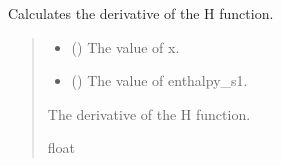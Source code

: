 \documentclass[a4paper,11pt,english,openany]{sphinxmanual}
\begin{document}
\begin{fulllineitems}
\label{\detokenize{api/spyice.update_physical_values:spyice.update_physical_values.H_function_derivate}}
\pysigstartsignatures
{}
\pysigstopsignatures
\sphinxAtStartPar
Calculates the derivative of the H function.
\begin{quote}\begin{description}
\begin{itemize}
\item {} 
\sphinxAtStartPar
{} () \textendash{} The value of x.

\item {} 
\sphinxAtStartPar
{} () \textendash{} The value of enthalpy\_s1.

\end{itemize}

\sphinxAtStartPar
The derivative of the H function.

\sphinxAtStartPar
float

\end{description}\end{quote}

\end{fulllineitems}

\end{document}
